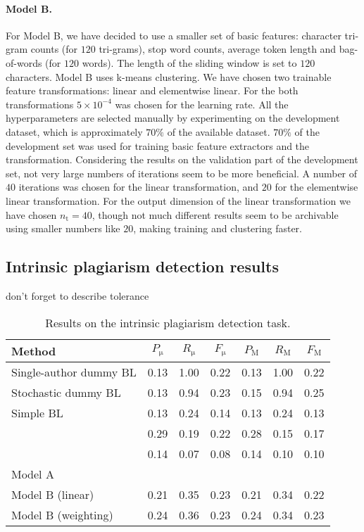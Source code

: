 \documentclass[10pt, a4paper]{article}
\begin{document}
\paragraph{Model B.} For Model B, we have decided to use a smaller set of basic features: character tri-gram counts (for $120$ tri-grams), stop word counts, average token length and bag-of-words (for $120$ words). The length of the sliding window is set to $120$ characters. Model B uses k-means clustering. We have chosen two trainable feature transformations: linear and elementwise linear. For the both transformations $5\times 10^{-4}$ was chosen for the learning rate. All the hyperparameters are selected manually by  experimenting on the development dataset, which is approximately $70\%$ of the available dataset. $70\%$ of the development set was used for training basic feature extractors and the transformation. Considering the results on the   validation part of the development set, not very large numbers of iterations seem to be more beneficial. A number of $40$ iterations was chosen for the linear transformation, and $20$ for the elementwise linear transformation. For the output dimension of the linear transformation we have chosen $n_\mathrm{t}=40$, though not much different results seem to be archivable using smaller numbers like $20$, making training and clustering faster.

\subsection{Intrinsic plagiarism detection results}

don't forget to describe tolerance

\begin{table*}
	\caption{Results on the intrinsic plagiarism detection task.}
	\label{tab:narrow-table}
	\begin{center}
		\begin{tabular}{l|ccc|ccc}
			\toprule
			Method & $P_\mathrm{\mu}$ & $R_\mathrm{\mu}$ & $F_\mathrm{\mu}$ & $P_\mathrm{M}$ & $R_\mathrm{M}$ & $F_\mathrm{M}$\\
			\midrule
			Single-author dummy BL 	& 0.13 & 1.00 & 0.22 & 0.13 & 1.00 & 0.22 \\
			Stochastic dummy BL 	& 0.13 & 0.94 & 0.23 & 0.15 & 0.94 & 0.25 \\
			Simple BL 				& 0.13 & 0.24 & 0.14 & 0.13 & 0.24 & 0.13 \\
			\midrule
			\citet{kuznetsov-2016} 	& 0.29 & 0.19 & 0.22 & 0.28 & 0.15 & 0.17 \\
			\citet{sittar-2016} 	& 0.14 & 0.07 & 0.08 & 0.14 & 0.10 & 0.10 \\
			\midrule			
			Model A 				&  &  &  &  &  & \\			
			Model B (linear) 		& 0.21 & 0.35 & 0.23 & 0.21 & 0.34 & 0.22 \\
			Model B (weighting) 	& 0.24 & 0.36 & 0.23 & 0.24 & 0.34 & 0.23 \\
			\bottomrule
		\end{tabular}
	\end{center}
\end{table*}
\end{document}
